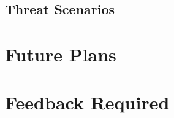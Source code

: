 \documentclass[11pt, a4paper, twoside, openany, notitlepage]{report}
\begin{document}
\section*{Threat Scenarios}





\chapter{Future Plans}





\chapter{Feedback Required}






\backmatter


%

\end{document}
